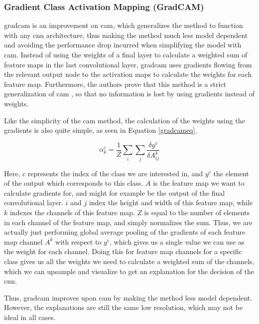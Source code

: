 \documentclass[UKenglish]{uiomasterthesis} %
\theoremstyle{definition}
\begin{document}
\subsubsection{Gradient Class Activation Mapping (GradCAM)} \label{section:gradcam}

\ac{gradcam} \cite{gradcam} is an improvement on \ac{cam}, which generalizes the method to function with any \ac{cnn} architecture, thus making the method much less model dependent and avoiding the performance drop incurred when simplifying the model with \ac{cam}. Instead of using the weights of a final layer to calculate a weighted sum of feature maps in the last convolutional layer, \ac{gradcam} uses gradients flowing from the relevant output node to the activation maps to calculate the weights for each feature map. Furthermore, the authors prove that this method is a strict generalization of \ac{cam} \cite[5]{gradcam}, so that no information is lost by using gradients instead of weights.

Like the simplicity of the \ac{cam} method, the calculation of the weights using the gradients is also quite simple, as seen in Equation \ref{gradcameq}.

\begin{equation}
\alpha^c_k = \frac{1}{Z} \sum_i \sum_j \frac{\delta y^c}{\delta A^k_{ij}}
\label{gradcameq}
\end{equation}

Here, $c$ represents the index of the class we are interested in, and $y^c$ the element of the output which corresponds to this class. $A$ is the feature map we want to calculate gradients for, and might for example be the output of the final convolutional layer. $i$ and $j$ index the height and width of this feature map, while $k$ indexes the channels of this feature map. $Z$ is equal to the number of elements in each channel of the feature map, and simply normalizes the sum. Thus, we are actually just performing global average pooling of the gradients of each feature map channel $A^k$ with respect to $y^c$, which gives us a single value we can use as the weight for each channel. Doing this for feature map channels for a specific class gives us all the weights we need to calculate a weighted sum of the channels, which we can upsample and visualize to get an explanation for the decision of the \ac{cnn}.

Thus, \ac{gradcam} improves upon \ac{cam} by making the method less model dependent. However, the explanations are still the same low resolution, which may not be ideal in all cases.
\end{document}
